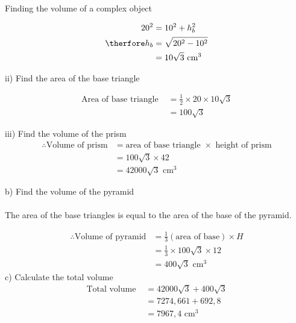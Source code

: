 \begin{wex}{Finding the volume of a complex object}
{\begin{align*}
 20^2 &= 10^2 + h_b^2\\
\therfore h_b&= \sqrt{20^2-10^2}\\
&=10 \sqrt{3}\mbox{ cm}^3
\end{align*}

ii) Find the area of the base triangle
% 

\begin{align*}
\mbox{Area of base triangle } &= \frac{1}{2} \times 20 \times 10 \sqrt{3}\\
&=100 \sqrt{3}
\end{align*}

iii) Find the volume of the prism
\begin{align*}
\therefore \mbox{Volume of prism} &= \mbox{area of base triangle }\times \mbox{ height of prism}\\
&=100 \sqrt{3} \times 42\\
&=42000\sqrt{3}\mbox{ cm}^3
\end{align*}

b) Find the volume of the pyramid\\
\\
The area of the base triangles is equal to the area of the base of the pyramid.

\begin{align*}
\therefore \mbox{Volume of pyramid} &= \frac{1}{3} (\mbox{area of base}) \times H\\
&= \frac{1}{3} \times 100 \sqrt{3} \times 12 \\

&=400\sqrt{3}\mbox{ cm}^3
\end{align*}
c) Calculate the total volume
\begin{align*}
\mbox{Total volume } &= 42000\sqrt{3}+400\sqrt{3}\\
&= 7274,661 + 692,8\\
&=7967,4\mbox{ cm}^3
\end{align*}

}
\end{wex}

